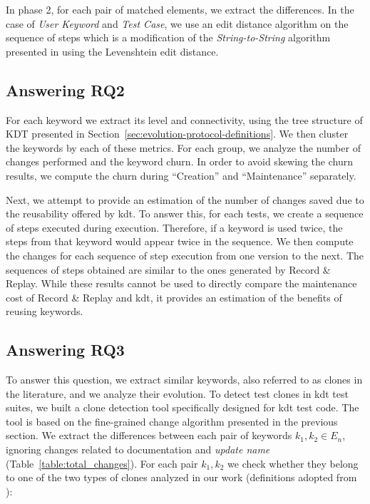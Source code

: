 In phase 2, for each pair of matched elements, we extract the differences. In the case of \emph{User Keyword} and \emph{Test Case}, we use an edit distance algorithm on the sequence of steps which is a modification of the \emph{String-to-String} algorithm presented in \cite{Ukkonen1985} using the Levenshtein edit distance.

\subsection{Answering RQ2}
\label{sec:evolution-protocol-rq2}

For each keyword we extract its level and connectivity, using the tree structure of KDT presented in Section~\ref{sec:evolution-protocol-definitions}. We then cluster the keywords by each of these metrics. For each group, we analyze the number of changes performed and the keyword churn. In order to avoid skewing the churn results, we compute the churn during ``Creation'' and ``Maintenance'' separately.

Next, we attempt to provide an estimation of the number of changes saved due to the reusability offered by \gls{kdt}. To answer this, for each tests, we create a sequence of steps executed during execution. Therefore, if a keyword is used twice, the steps from that keyword would appear twice in the sequence. We then compute the changes for each sequence of step execution from one version to the next. The sequences of steps obtained are similar to the ones generated by Record \& Replay. While these results cannot be used to directly compare the maintenance cost of Record \& Replay and \gls{kdt}, it provides an estimation of the benefits of reusing keywords.

\subsection{Answering RQ3}
\label{sec:evolution-protocol-rq3}

To answer this question, we extract similar keywords, also referred to as clones in the literature, and we analyze their evolution. To detect test clones in \gls{kdt} test suites, we built a clone detection tool specifically designed for \gls{kdt} test code. The tool is based on the fine-grained change algorithm presented in the previous section. We extract the differences between each pair of keywords $k_1, k_2 \in E_n$, ignoring changes related to documentation and \emph{update name} (Table~\ref{table:total_changes}).  For each pair $k_1, k_2$ we check whether they belong to one of the two types of clones analyzed in our work (definitions adopted from \cite{Lavoie2017}):

